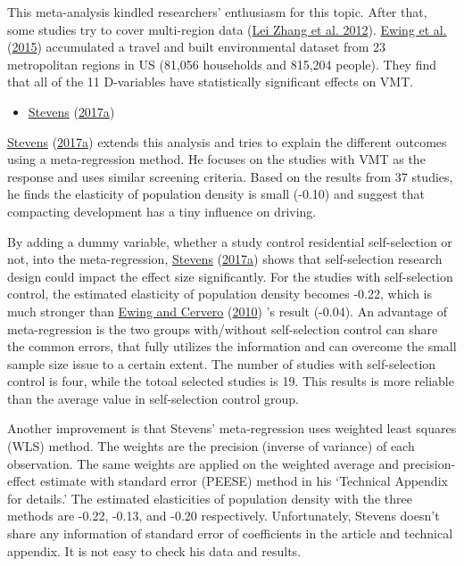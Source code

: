 \documentclass[
  11pt,
  openany]{memoir}
\providecommand{\tightlist}{%
  \setlength{\itemsep}{0pt}\setlength{\parskip}{0pt}}
\begin{document}
This meta-analysis kindled researchers' enthusiasm for this topic. After that, some studies try to cover multi-region data (\protect\hyperlink{ref-zhangHowBuiltEnvironment2012}{Lei Zhang et al. 2012}). \protect\hyperlink{ref-ewingVaryingInfluencesBuilt2015}{Ewing et al.} (\protect\hyperlink{ref-ewingVaryingInfluencesBuilt2015}{2015}) accumulated a travel and built environmental dataset from 23 metropolitan regions in US (81,056 households and 815,204 people). They find that all of the 11 D-variables have statistically significant effects on VMT.

\begin{itemize}
\tightlist
\item
  \protect\hyperlink{ref-stevensDoesCompactDevelopment2017}{Stevens} (\protect\hyperlink{ref-stevensDoesCompactDevelopment2017}{2017a})
\end{itemize}

\protect\hyperlink{ref-stevensDoesCompactDevelopment2017}{Stevens} (\protect\hyperlink{ref-stevensDoesCompactDevelopment2017}{2017a}) extends this analysis and tries to explain the different outcomes using a meta-regression method. He focuses on the studies with VMT as the response and uses similar screening criteria. Based on the results from 37 studies, he finds the elasticity of population density is small (-0.10) and suggest that compacting development has a tiny influence on driving.

By adding a dummy variable, whether a study control residential self-selection or not, into the meta-regression, \protect\hyperlink{ref-stevensDoesCompactDevelopment2017}{Stevens} (\protect\hyperlink{ref-stevensDoesCompactDevelopment2017}{2017a}) shows that self-selection research design could impact the effect size significantly. For the studies with self-selection control, the estimated elasticity of population density becomes -0.22, which is much stronger than \protect\hyperlink{ref-ewingTravelBuiltEnvironment2010}{Ewing and Cervero} (\protect\hyperlink{ref-ewingTravelBuiltEnvironment2010}{2010}) 's result (-0.04). An advantage of meta-regression is the two groups with/without self-selection control can share the common errors, that fully utilizes the information and can overcome the small sample size issue to a certain extent. The number of studies with self-selection control is four, while the totoal selected studies is 19. This results is more reliable than the average value in self-selection control group.

Another improvement is that Stevens' meta-regression uses weighted least squares (WLS) method. The weights are the precision (inverse of variance) of each observation. The same weights are applied on the weighted average and precision-effect estimate with standard error (PEESE) method in his `Technical Appendix for details.' The estimated elasticities of population density with the three methods are -0.22, -0.13, and -0.20 respectively. Unfortunately, Stevens doesn't share any information of standard error of coefficients in the article and technical appendix. It is not easy to check his data and results.
\end{document}
